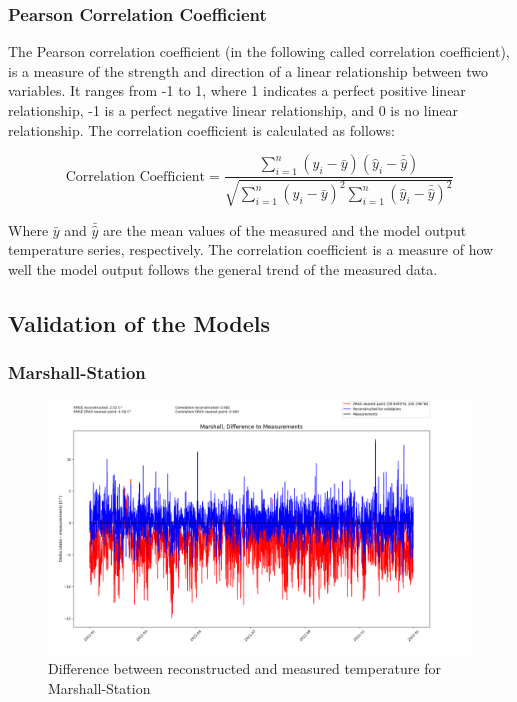 \subsubsection*{Pearson Correlation Coefficient}

The Pearson correlation coefficient (in the following called correlation coefficient), is a measure of the strength and direction of a linear relationship between two variables. It ranges from -1 to 1, where 1 indicates a perfect positive linear relationship, -1 is a perfect negative linear relationship, and 0 is no linear relationship. The correlation coefficient is calculated as follows:

\begin{equation}
    \text{Correlation Coefficient} = \frac{\sum_{i=1}^{n} (y_i - \bar{y})(\hat{y}_i - \bar{\hat{y}})}{\sqrt{\sum_{i=1}^{n} (y_i - \bar{y})^2 \sum_{i=1}^{n} (\hat{y}_i - \bar{\hat{y}})^2}}
    \label{eq:correlation}
\end{equation}
    
Where $\bar{y}$ and $\bar{\hat{y}}$ are the mean values of the measured and the model output temperature series, respectively. The correlation coefficient is a measure of how well the model output follows the general trend of the measured data. \cite{Zou2003Correlation}

\subsection{Validation of the Models}

\subsubsection*{Marshall-Station}

\begin{figure}
    \centering
    \includegraphics[width=1.07\textwidth]{resources/images/charts/marshall_eval_grib_final/Marshall, Difference to Measurements.png}
    \caption{Difference between reconstructed and measured temperature for Marshall-Station}
    \label{fig:marshall_diff}
\end{figure}

